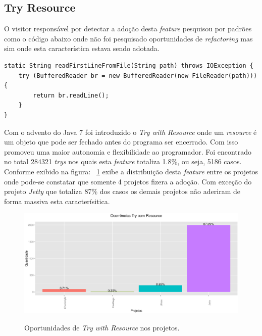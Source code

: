 \subsection{Try Resource}
O visitor responsável por detectar a adoção desta \textit{feature} pesquisou por padrões como o código abaixo onde não foi pesquisado oportunidades de \textit{refactoring} mas sim onde esta característica estava sendo adotada.
\begin{lstlisting}
static String readFirstLineFromFile(String path) throws IOException {
	try (BufferedReader br = new BufferedReader(new FileReader(path))) {
		return br.readLine();
	}
}
\end{lstlisting}

Com o advento do Java 7 foi introduzido o \textit{Try with Resource} onde um \textit{resource} é um objeto que pode ser fechado antes do programa ser encerrado. Com isso promoveu uma maior autonomia e flexibilidade ao programador. Foi encontrado no total 284321 \textit{trys} nos quais  esta \textit{feature} totaliza 1.8\%, ou seja, 5186 casos. Conforme exibido na figura: ~\ref{fig:Try with Resource} exibe a distribuição desta \textit{feature} entre os projetos onde pode-se constatar que somente 4 projetos fizera a adoção. Com exceção do projeto \textit{Jetty} que totaliza 87\% dos casos os demais projetos não aderiram de forma massiva esta caracterísitica.


\begin{figure}[h]
	\center
	\includegraphics[scale=0.5]{Imagens/ocorrenciasTryResource}
	\label{fig:Try with Resource}
	\caption{Oportunidades de \textit{Try with Resource} nos projetos.}
\end{figure}


